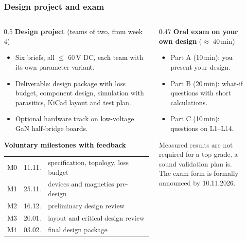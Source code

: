 \begin{frame}
	\frametitle{Design project and exam}
	\begin{columns}[T]
		\begin{column}{0.5\textwidth}
			\textbf{Design project} (teams of two, from week 4)
			\begin{itemize}
				\item Six briefs, all $\leq$ 60\,V DC, each team with its own parameter variant.
				\item Deliverable: design package with loss budget, component design, simulation with parasitics, KiCad layout and test plan.
				\item Optional hardware track on low-voltage GaN half-bridge boards.
			\end{itemize}
			\textbf{Voluntary milestones with feedback}\\
			{\footnotesize
				\begin{tabular}{lll}
					M0 & 11.11. & specification, topology, loss budget \\
					M1 & 25.11. & devices and magnetics pre-design      \\
					M2 & 16.12. & preliminary design review             \\
					M3 & 20.01. & layout and critical design review     \\
					M4 & 03.02. & final design package                  \\
				\end{tabular}}
		\end{column}
		\begin{column}{0.47\textwidth}
			\textbf{Oral exam on your own design} ($\approx$ 40\,min)
			\begin{itemize}
				\item Part A (10\,min): you present your design.
				\item Part B (20\,min): what-if questions with short calculations.
				\item Part C (10\,min): questions on L1--L14.
			\end{itemize}
			Measured results are not required for a top grade, a sound validation plan is.\\[0.5em]
			{\footnotesize The exam form is formally announced by 10.11.2026.}
		\end{column}
	\end{columns}
\end{frame}

